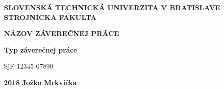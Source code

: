 \renewcommand\thepage{\roman{page}}
\thispagestyle{empty}

\noindent \begin{center}
\textbf{{\large{}SLOVENSKÁ TECHNICKÁ UNIVERZITA V BRATISLAVE}}\\
\textbf{{\large{}STROJNÍCKA FAKULTA}}\textbf{\large{} }\\
\vspace{3cm}
\par\end{center}

\noindent \begin{center}
\vspace{3cm}
\par\end{center}



\begin{center}
\textbf{\textsc{\Large{}NÁZOV ZÁVEREČNEJ PRÁCE}}\\
\par\end{center}{\Large \par}

\begin{center}
\textbf{\large{}Typ záverečnej práce}\\
\par\end{center}{\large \par}

\begin{center}
{\large{}SjF-12345-67890}\\
\par\end{center}{\large \par}



\vfill
\noindent \textbf{\large{}2018} \hfill \textbf{\large{}Jožko Mrkvička}
\cleardoublepage
